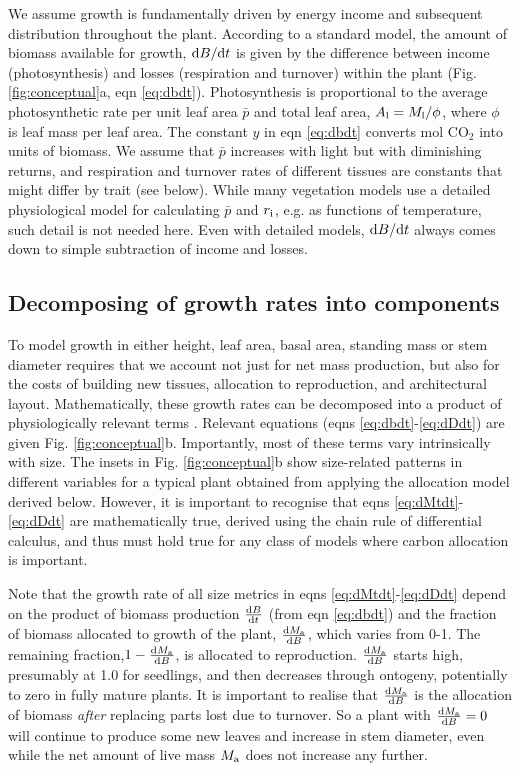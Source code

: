\documentclass[a4paper,11pt]{article}
\begin{document}
We assume growth is fundamentally driven by energy income and subsequent distribution throughout the plant. According to a standard model, the amount of biomass available for growth, ${\rm d}B / {\rm d}t$ is given by the difference between income (photosynthesis) and losses (respiration and turnover) within the plant \citep{Makela-1997, Thornley-2000} (Fig. \ref{fig:conceptual}a, eqn \ref{eq:dbdt}). Photosynthesis is proportional to the average photosynthetic rate per unit leaf area $\bar{p}$ and total leaf area, $A_{\rm l} = M_{\rm l} / \phi$, where $\phi$ is leaf mass per leaf area. The constant $y$ in eqn \ref{eq:dbdt} converts mol CO$_2$ into units of biomass. We assume that $\bar{p}$ increases with light but with diminishing returns, and respiration and turnover rates of different tissues are constants that might differ by trait (see below). While many vegetation models use a detailed physiological model for calculating $\bar{p}$ and $r_{\rm i}$, e.g. as functions of temperature, such detail is not needed here. Even with detailed models, ${\rm d}B / {\rm d}t$ always comes down to simple subtraction of income and losses.

\subsection{Decomposing of growth rates into components}

To model growth in either height, leaf area, basal area, standing mass or stem diameter requires that we account not just for net mass production, but also for the costs of building new tissues, allocation to reproduction, and architectural layout. Mathematically, these growth rates can be decomposed into a product of physiologically relevant terms \citep{Falster-2011, Gibert-2016}. Relevant equations (eqns \ref{eq:dbdt}-\ref{eq:dDdt}) are given Fig. \ref{fig:conceptual}b. Importantly, most of these terms vary intrinsically with size. The insets in Fig. \ref{fig:conceptual}b show size-related patterns in different variables for a typical plant obtained from applying the allocation model derived below. However, it is important to recognise that eqns \ref{eq:dMtdt}-\ref{eq:dDdt} are mathematically true, derived using the chain rule of differential calculus, and thus must hold true for any class of models where carbon allocation is important.

Note that the growth rate of all size metrics in eqns \ref{eq:dMtdt}-\ref{eq:dDdt} depend on the product of biomass production $\frac{{\rm d}B} {{\rm d}t}$ (from eqn \ref{eq:dbdt}) and the fraction of biomass allocated to growth of the plant, $\frac{{\rm d}M_{\rm a}}{{\rm d}B}$, which varies from 0-1. The remaining fraction,$1- \frac{{\rm d}M_{\rm a}}{{\rm d}B}$, is allocated to reproduction. $\frac{{\rm d}M_{\rm a}}{{\rm d}B}$ starts high, presumably at 1.0 for seedlings, and then decreases through ontogeny, potentially to zero in fully mature plants. It is important to realise that $\frac{{\rm d}M_{\rm a}}{{\rm d}B}$ is the allocation of biomass \emph{after} replacing parts lost due to turnover. So a plant with $\frac{{\rm d}M_{\rm a}}{{\rm d}B}=0$ will continue to produce some new leaves and increase in stem diameter, even while the net amount of live mass $M_{\rm a}$ does not increase any further.
\end{document}
